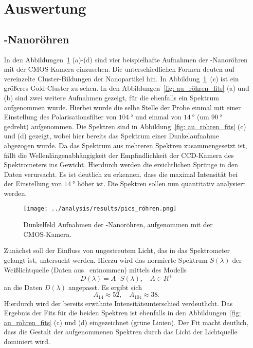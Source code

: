 \section{Auswertung}
\label{sec: analysis}

\subsection{-Nanoröhren}
\label{sec: auröhren}
In den Abbildungen~\ref{fig: au_röhren_bilder} (a)-(d) sind vier beispielhafte Aufnahmen der
-Nanoröhren mit der CMOS-Kamera einzusehen. Die unterschiedlichen Formen deuten auf vereinzelte
Cluster-Bildungen der Nanopartikel hin. In Abbildung~\ref{fig: au_röhren_bilder}~(c) ist ein größeres Gold-Cluster
zu sehen.
In den Abbildungen~\ref{fig: au_röhren_fits} (a) und (b) sind zwei weitere Aufnahmen gezeigt, für die
ebenfalls ein Spektrum aufgenommen wurde. Hierbei wurde die selbe Stelle der
Probe einmal mit einer Einstellung des Polarisationsfilter von $\SI{104}{\degree}$
und einmal von $\SI{14}{\degree}$ (um $\SI{90}{\degree}$ gedreht) aufgenommen.
Die Spektren sind in Abbildung~\ref{fig: au_röhren_fits} (c) und (d) gezeigt, wobei
hier bereits das Spektrum einer Dunkelaufnahme abgezogen wurde.
Da das Spektrum aus mehreren Spektren zusammengesetzt ist, fällt die Wellenlängenabhängigkeit
der Empfindlichkeit der CCD-Kamera des Spektrometers
ins Gewicht. Hierdurch werden die ersichtlichen Sprünge in den Daten verursacht.
Es ist deutlich zu erkennen, dass
die maximal Intensität bei der Einstellung von $\SI{14}{\degree}$ höher ist.
Die Spektren sollen
nun quantitativ analysiert werden.
\begin{figure}
  \centering
  \texttt{[image: ../analysis/results/pics\_röhren.png]}
  \caption{Dunkelfeld Aufnahmen der -Nanoröhren, aufgenommen mit der CMOS-Kamera.}
  \label{fig: au_röhren_bilder}
\end{figure}

Zunächst soll der Einfluss von ungestreutem Licht, das in das Spektrometer gelangt ist, untersucht werden.
Hierzu wird das normierte Spektrum $S(\lambda)$ der Weißlichtquelle (Daten aus~\cite{thorlabs} entnommen)
mittels des Modells
\begin{equation}
  D(\lambda) = A \cdot S(\lambda), \quad A \in R^{+}
  \label{eq: fit_light}
\end{equation}
an die Daten $D(\lambda)$ angepasst.
Es ergibt sich
\begin{equation}
  A_{14} \approx 52, \quad A_{104} \approx 38.
\end{equation}
Hierdurch wird der bereits erwähnte Intensitätsunterschied verdeutlicht.
Das Ergebnis der Fits für die beiden Spektren ist ebenfalls in den Abbildungen~\ref{fig: au_röhren_fits} (c) und (d)
eingezeichnet (grüne Linien). Der Fit macht deutlich, dass die Gestalt der aufgenommenen Spektren
durch das Licht der Lichtquelle dominiert wird.

